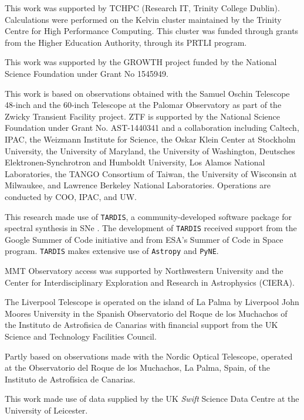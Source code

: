 \documentclass[twocolumn]{aastex63}
\begin{document}
This work was supported by TCHPC (Research IT, Trinity College Dublin).
Calculations were performed on the Kelvin cluster maintained by the Trinity
Centre for High Performance Computing. This cluster was funded through grants
from the Higher Education Authority, through its PRTLI program.

This work was supported by the GROWTH project funded by the National Science
Foundation under Grant No 1545949.

This work is based on observations obtained with the Samuel Oschin Telescope
48-inch and the 60-inch Telescope at the Palomar Observatory as part of the
Zwicky Transient Facility project. ZTF is supported by the National Science
Foundation under Grant No. AST-1440341 and a collaboration including Caltech,
IPAC, the Weizmann Institute for Science, the Oskar Klein Center at Stockholm
University, the University of Maryland, the University of Washington,
Deutsches Elektronen-Synchrotron and Humboldt University, Los Alamos National
Laboratories, the TANGO Consortium of Taiwan, the University of Wisconsin at
Milwaukee, and Lawrence Berkeley National Laboratories. Operations are
conducted by COO, IPAC, and UW.

This research made use of \texttt{TARDIS}, a community-developed software
package for spectral synthesis in SNe \citep{Kerzendorf14}. The development of
\texttt{TARDIS} received support from the Google Summer of Code initiative and
from ESA's Summer of Code in Space program. \texttt{TARDIS} makes extensive
use of \texttt{Astropy} and \texttt{PyNE}.

MMT Observatory access was supported by Northwestern University and the
Center for Interdisciplinary Exploration and Research in Astrophysics (CIERA).

The Liverpool Telescope is operated on the island of La Palma by Liverpool
John Moores University in the Spanish Observatorio del Roque de los Muchachos
of the Instituto de Astrofisica de Canarias with financial support from the UK
Science and Technology Facilities Council.

Partly based on observations made with the Nordic Optical Telescope, operated
at the Observatorio del Roque de los Muchachos, La Palma, Spain, of the
Instituto de Astrof\'isica de Canarias.

This work made use of data supplied by the UK \textit{Swift} Science Data
Centre at the University of Leicester.

\end{document}
